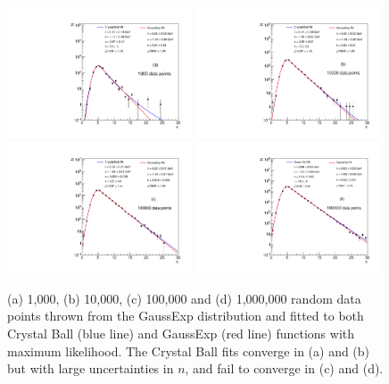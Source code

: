 \documentclass[10pt,letterpaper]{article}
\begin{document}
\begin{figure}[H]
\centering
\includegraphics[width=0.49\textwidth]{c_distribution_1e3.pdf}
\includegraphics[width=0.49\textwidth]{c_distribution_1e4.pdf}
\includegraphics[width=0.49\textwidth]{c_distribution_1e5.pdf}
\includegraphics[width=0.49\textwidth]{c_distribution_1e6.pdf}
\caption{(a) 1,000, (b) 10,000, (c) 100,000 and (d) 1,000,000 random data points thrown from the GaussExp distribution and fitted to both Crystal Ball (blue line) and GaussExp (red line) functions with maximum likelihood. The Crystal Ball fits converge in (a) and (b) but with large uncertainties in $n$, and fail to converge in (c) and (d).}
\label{fig:ThrowCatch}
\end{figure}
\end{document}
